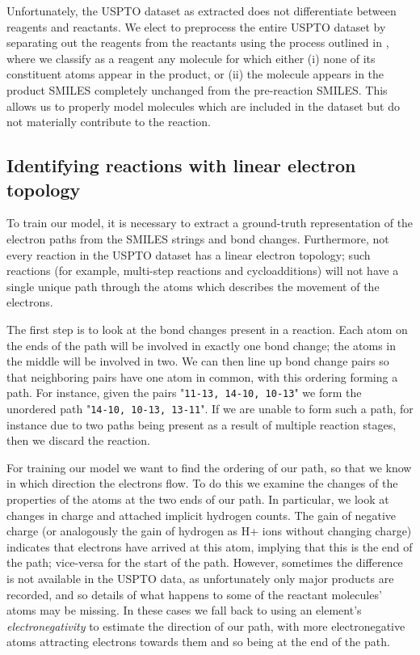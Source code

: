 Unfortunately, the USPTO dataset as extracted does not differentiate between reagents and reactants.
We elect to preprocess the entire USPTO dataset by separating out the reagents from the reactants using the process outlined in \citet{schwaller2017found}, where we classify as a reagent any molecule for which either 
(i) none of its constituent atoms appear in the product, or 
(ii) the molecule appears in the product SMILES completely unchanged from the pre-reaction SMILES.
This allows us to properly model molecules which are included in the dataset but do not materially contribute to the reaction.

\subsection{Identifying reactions with linear electron topology}

To train our model, it is necessary to extract a ground-truth representation of the electron paths from the SMILES strings and bond changes.
Furthermore, not every reaction in the USPTO dataset has a linear electron topology; 
such reactions (for example, multi-step reactions and cycloadditions) will not have a single unique path through the atoms 
which describes the movement of the electrons.

The first step is to look at the bond changes present in a reaction. 
Each atom on the ends of the path will be involved in exactly one bond change;
the atoms in the middle will be involved in two. 
We can then line up bond change pairs so that neighboring pairs have one atom in common,
 with this ordering forming a path.
For instance, given the pairs "\texttt{11-13, 14-10, 10-13}" we form the unordered path "\texttt{14-10, 10-13, 13-11}".
If we are unable to form such a path, for instance due to two paths being present as a result of multiple reaction stages, then we discard the reaction.

For training our model we want to find the ordering of our path, so that we know in which direction the electrons flow.
To do this we examine the changes of the properties of the atoms at the two ends of our path. 
In particular, we look at changes in charge and attached implicit hydrogen counts. 
The gain of negative charge (or analogously the gain of hydrogen as H+ ions without changing charge) indicates that electrons have arrived at this atom, 
implying that this is the end of the path; 
vice-versa for the start of the path.
However, sometimes the difference is not available in the USPTO data, as unfortunately only major products are recorded, and so details of what happens to some of the reactant molecules' atoms may be missing.
In these cases we fall back to using an element's {\em electronegativity} to estimate the direction of our path, with more electronegative atoms attracting electrons towards them and so being at the end of the path. 


